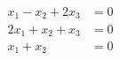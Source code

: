 \begin{align*}
x_1 -x_2 +2x_3 & = 0\\
 2x_1+ x_2 + x_3 & = 0\\
 x_1 + x_2\quad\quad & = 0
\end{align*}